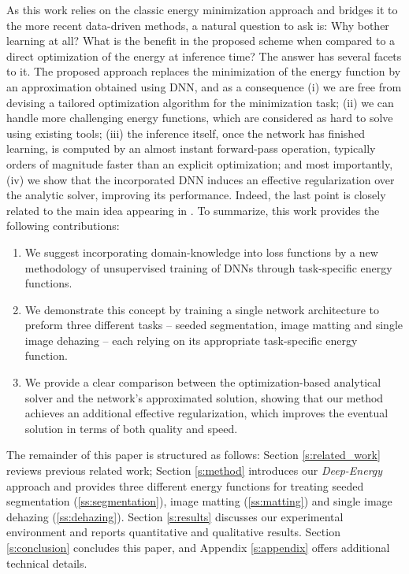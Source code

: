 \documentclass[journal]{IEEEtran}
\begin{document}
As this work relies on the classic energy minimization approach and bridges it to the more recent data-driven methods, a natural question to ask is: Why bother learning at all? What is the benefit in the proposed scheme when compared to a direct optimization of the energy at inference time? The answer has several facets to it. The proposed approach replaces the minimization of the energy function by an approximation obtained using DNN, and as a consequence (i) we are free from devising a tailored optimization algorithm for the minimization task; (ii) we can handle more challenging energy functions, which are considered as hard to solve using existing tools; (iii) the inference itself, once the network has finished learning, is computed by an almost instant forward-pass operation, typically orders of magnitude faster than an explicit optimization; and most importantly, (iv) we show that the incorporated DNN induces an effective regularization over the analytic solver, improving its performance. Indeed, the last point is closely related to the main idea appearing in \cite{deep_image_prior}. To summarize, this work provides the following contributions:
\begin{enumerate}
	\item We suggest incorporating domain-knowledge into loss functions by a new methodology of unsupervised training of DNNs through task-specific energy functions.
	\item We demonstrate this concept by training a single network architecture to preform three different tasks -- seeded segmentation, image matting and single image dehazing -- each relying on its appropriate task-specific energy function.
	\item We provide a clear comparison between the optimization-based analytical solver and the network's approximated solution, showing that our method achieves an additional effective regularization, which improves the eventual solution in terms of both quality and speed.
\end{enumerate}

\noindent The remainder of this paper is structured as follows: Section \ref{s:related_work} reviews previous related work; Section \ref{s:method} introduces our \emph{Deep-Energy} approach and provides three different energy functions for treating seeded segmentation (\ref{ss:segmentation}), image matting (\ref{ss:matting}) and single image dehazing (\ref{ss:dehazing}). Section \ref{s:results} discusses our experimental environment and reports quantitative and qualitative results. Section \ref{s:conclusion} concludes this paper, and Appendix \ref{s:appendix} offers additional technical details.
\end{document}
